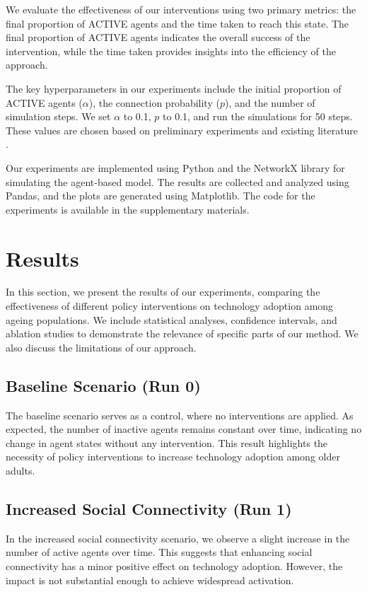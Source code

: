 \documentclass{article} %
\begin{document}
We evaluate the effectiveness of our interventions using two primary metrics: the final proportion of ACTIVE agents and the time taken to reach this state. The final proportion of ACTIVE agents indicates the overall success of the intervention, while the time taken provides insights into the efficiency of the approach.

The key hyperparameters in our experiments include the initial proportion of ACTIVE agents (\(\alpha\)), the connection probability (\(p\)), and the number of simulation steps. We set \(\alpha\) to 0.1, \(p\) to 0.1, and run the simulations for 50 steps. These values are chosen based on preliminary experiments and existing literature \citep{liu2023agentbench}.

Our experiments are implemented using Python and the NetworkX library for simulating the agent-based model. The results are collected and analyzed using Pandas, and the plots are generated using Matplotlib. The code for the experiments is available in the supplementary materials.

\section{Results}
\label{sec:results}

In this section, we present the results of our experiments, comparing the effectiveness of different policy interventions on technology adoption among ageing populations. We include statistical analyses, confidence intervals, and ablation studies to demonstrate the relevance of specific parts of our method. We also discuss the limitations of our approach.

\subsection{Baseline Scenario (Run 0)}
The baseline scenario serves as a control, where no interventions are applied. As expected, the number of inactive agents remains constant over time, indicating no change in agent states without any intervention. This result highlights the necessity of policy interventions to increase technology adoption among older adults.


\subsection{Increased Social Connectivity (Run 1)}
In the increased social connectivity scenario, we observe a slight increase in the number of active agents over time. This suggests that enhancing social connectivity has a minor positive effect on technology adoption. However, the impact is not substantial enough to achieve widespread activation.
\end{document}
